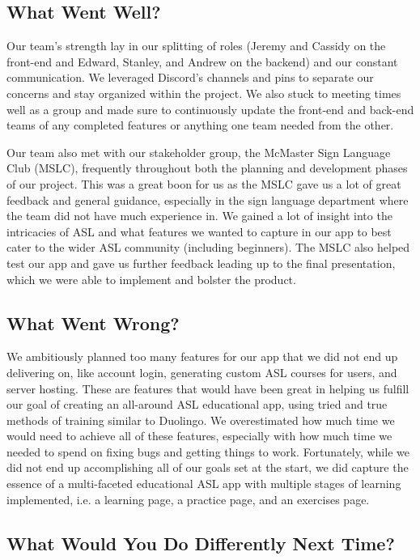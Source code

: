 \documentclass{article}
\begin{document}
\subsection{What Went Well?}

Our team's strength lay in our splitting of roles (Jeremy and Cassidy on the front-end and Edward, Stanley, and Andrew on the backend) and our constant communication. We leveraged Discord's channels and pins to separate our concerns and stay organized within the project. We also stuck to meeting times well as a group and made sure to continuously update the front-end and back-end teams of any completed features or anything one team needed from the other.

Our team also met with our stakeholder group, the McMaster Sign Language Club (MSLC), frequently throughout both the planning and development phases of our project. This was a great boon for us as the MSLC gave us a lot of great feedback and general guidance, especially in the sign language department where the team did not have much experience in. We gained a lot of insight into the intricacies of ASL and what features we wanted to capture in our app to best cater to the wider ASL community (including beginners). The MSLC also helped test our app and gave us further feedback leading up to the final presentation, which we were able to implement and bolster the product.

\subsection{What Went Wrong?}

We ambitiously planned too many features for our app that we did not end up delivering on, like account login, generating custom ASL courses for users, and server hosting. These are features that would have been great in helping us fulfill our goal of creating an all-around ASL educational app, using tried and true methods of training similar to Duolingo. We overestimated how much time we would need to achieve all of these features, especially with how much time we needed to spend on fixing bugs and getting things to work. Fortunately, while we did not end up accomplishing all of our goals set at the start, we did capture the essence of a multi-faceted educational ASL app with multiple stages of learning implemented, i.e. a learning page, a practice page, and an exercises page. 

\subsection{What Would You Do Differently Next Time?}
\end{document}
